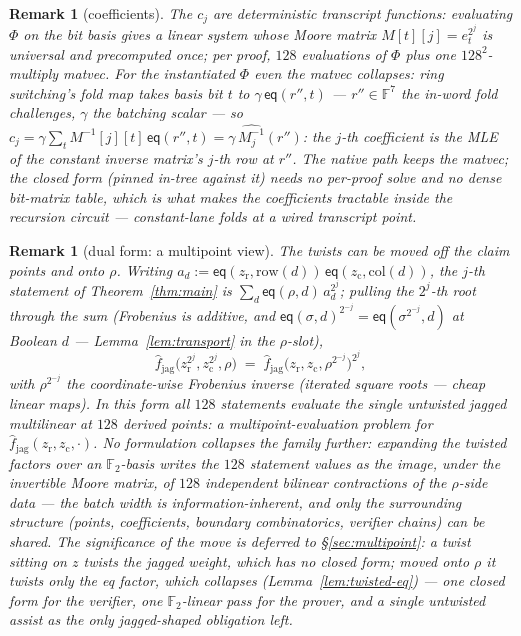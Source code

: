 \documentclass[11pt]{article}
\newcommand{\F}{\mathbb{F}}
\newcommand{\Ftwo}{\F_2}
\newcommand{\eq}{\mathsf{eq}}
\newcommand{\rowof}{\mathrm{row}}
\newcommand{\colof}{\mathrm{col}}
\newcommand{\fjag}{\hat f_{\mathrm{jag}}}
\newtheorem{remark}[theorem]{Remark}
\begin{document}
\begin{remark}[coefficients]\label{rem:moore}
The $c_j$ are deterministic transcript functions: evaluating $\Phi$
on the bit basis gives a linear system whose Moore matrix
$M[t][j] = e_t^{2^j}$ is universal and precomputed once; per proof,
$128$ evaluations of $\Phi$ plus one $128^2$-multiply matvec. For the
instantiated $\Phi$ even the matvec collapses: ring switching's fold
map takes basis bit $t$ to $\gamma\,\eq(r'', t)$ --- $r'' \in \F^{7}$
the in-word fold challenges, $\gamma$ the batching scalar --- so
$c_j = \gamma \sum_t M^{-1}[j][t]\, \eq(r'', t) =
\gamma\, \widehat{M^{-1}_j}(r'')$: the $j$-th coefficient is the MLE
of the \emph{constant} inverse matrix's $j$-th row at $r''$. The
native path keeps the matvec; the closed form (pinned in-tree against
it) needs no per-proof solve and no dense bit-matrix table, which is
what makes the coefficients tractable \emph{inside the recursion
circuit} --- constant-lane folds at a wired transcript point.
\end{remark}

\begin{remark}[dual form: a multipoint view]\label{rem:dual}
The twists can be moved off the claim points and onto $\rho$. Writing
$a_d := \eq(z_{\mathrm r}, \rowof(d))\,\eq(z_{\mathrm c}, \colof(d))$,
the $j$-th statement of Theorem~\ref{thm:main} is
$\sum_d \eq(\rho, d)\, a_d^{2^j}$; pulling the $2^j$-th root through
the sum (Frobenius is additive, and
$\eq(\sigma, d)^{2^{-j}} = \eq(\sigma^{2^{-j}}, d)$ at Boolean $d$ ---
Lemma~\ref{lem:transport} in the $\rho$-slot),
\[
  \fjag\bigl(z_{\mathrm r}^{2^j}, z_{\mathrm c}^{2^j}, \rho\bigr)
  \;=\;
  \fjag\bigl(z_{\mathrm r}, z_{\mathrm c}, \rho^{2^{-j}}\bigr)^{2^j},
\]
with $\rho^{2^{-j}}$ the coordinate-wise Frobenius inverse (iterated
square roots --- cheap linear maps). In this form all $128$ statements
evaluate the \emph{single untwisted} jagged multilinear at $128$
derived points: a multipoint-evaluation problem for
$\fjag(z_{\mathrm r}, z_{\mathrm c}, \cdot)$.
No formulation collapses the family further: expanding the twisted
factors over an $\Ftwo$-basis writes the $128$ statement values as the
image, under the invertible Moore matrix, of $128$ independent
bilinear contractions of the $\rho$-side data --- the batch width is
information-inherent, and only the surrounding structure (points,
coefficients, boundary combinatorics, verifier chains) can be shared.
The significance of the move is deferred to \S\ref{sec:multipoint}: a
twist sitting on $z$ twists the \emph{jagged} weight, which has no
closed form; moved onto $\rho$ it twists only the \emph{eq} factor,
which collapses (Lemma~\ref{lem:twisted-eq}) --- one closed form for
the verifier, one $\Ftwo$-linear pass for the prover, and a single
untwisted assist as the only jagged-shaped obligation left.
\end{remark}
\end{document}
